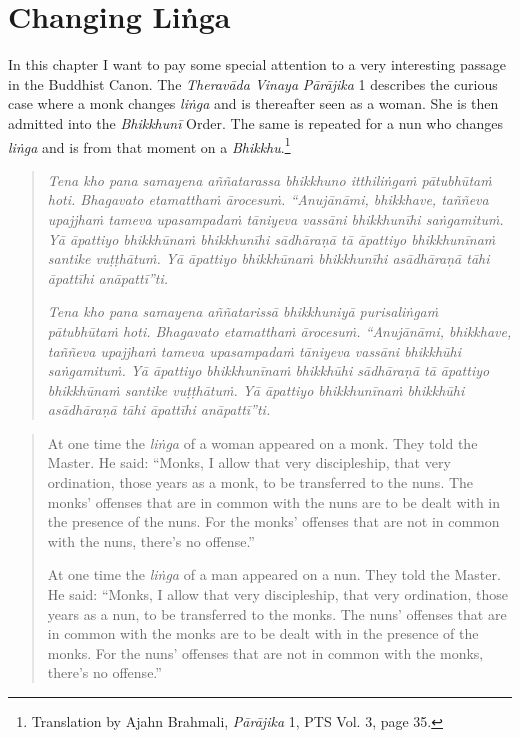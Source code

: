 \section{Changing Liṅga}
\label{trans}

In this chapter I want to pay some special attention to a very interesting passage in the Buddhist Canon. The \textit{Theravāda Vinaya} \textit{Pā­rāji­ka} 1 describes the curious case where a monk changes \textit{liṅga} and is thereafter seen as a woman. She is then admitted into the \textit{Bhikkhunī} Order. The same is repeated for a nun who changes \textit{liṅga} and is from that moment on a \textit{Bhikkhu}.\footnote{Translation by Ajahn Brahmali, \textit{Pā­rāji­ka} 1, PTS Vol. 3, page 35.} 

\begin{quote}
\textit{Tena kho pana samayena aññatarassa bhikkhuno itthiliṅgaṁ pātubhūtaṁ hoti. Bhagavato etamatthaṁ ārocesuṁ. ``Anujānāmi, bhikkhave, taññeva upajjhaṁ tameva upasampadaṁ tāniyeva vassāni bhikkhunīhi saṅgamituṁ. Yā āpattiyo bhikkhūnaṁ bhikkhunīhi sādhāraṇā tā āpattiyo bhikkhunīnaṁ santike vuṭṭhātuṁ. Yā āpattiyo bhikkhūnaṁ bhikkhunīhi asādhāraṇā tāhi āpattīhi anāpattī''ti.}

\textit{Tena kho pana samayena aññatarissā bhikkhuniyā purisaliṅgaṁ pātubhūtaṁ hoti. Bhagavato etamatthaṁ ārocesuṁ. ``Anujānāmi, bhikkhave, taññeva upajjhaṁ tameva upasampadaṁ tāniyeva vassāni bhikkhūhi saṅgamituṁ. Yā āpattiyo bhikkhunīnaṁ bhikkhūhi sādhāraṇā tā āpattiyo bhikkhūnaṁ santike vuṭṭhātuṁ. Yā āpattiyo bhikkhunīnaṁ bhikkhūhi asādhāraṇā tāhi āpattīhi anāpattī''ti.}
\end{quote}

\begin{quote}
At one time the \textit{liṅga} of a woman appeared on a monk. They told the Master. He said: ``Monks, I allow that very discipleship, that very ordination, those years as a monk, to be transferred to the nuns. The monks' offenses that are in common with the nuns are to be dealt with in the presence of the nuns. For the monks' offenses that are not in common with the nuns, there's no offense.''

At one time the \textit{liṅga} of a man appeared on a nun. They told the Master. He said: ``Monks, I allow that very discipleship, that very ordination, those years as a nun, to be transferred to the monks. The nuns' offenses that are in common with the monks are to be dealt with in the presence of the monks. For the nuns' offenses that are not in common with the monks, there's no offense.''
\end{quote}

